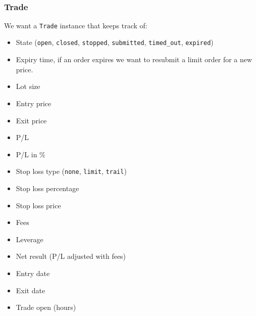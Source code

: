 \documentclass[11pt]{article}
\providecommand{\tightlist}{%
      \setlength{\itemsep}{0pt}\setlength{\parskip}{0pt}}
\begin{document}
    \begin{center}
    \end{center}
    { \hspace*{\fill} \\}
    
    \hypertarget{trade}{%
\subsubsection{Trade}\label{trade}}

    We want a \texttt{Trade} instance that keeps track of:

\begin{itemize}
\tightlist
\item
  State (\texttt{open}, \texttt{closed}, \texttt{stopped},
  \texttt{submitted}, \texttt{timed\_out}, \texttt{expired})
\item
  Expiry time, if an order expires we want to resubmit a limit order for
  a new price.
\item
  Lot size
\item
  Entry price
\item
  Exit price
\item
  P/L
\item
  P/L in \%
\item
  Stop loss type (\texttt{none}, \texttt{limit}, \texttt{trail})
\item
  Stop loss percentage
\item
  Stop loss price
\item
  Fees
\item
  Leverage
\item
  Net result (P/L adjusted with fees)
\item
  Entry date
\item
  Exit date
\item
  Trade open (hours)
\end{itemize}
\end{document}

